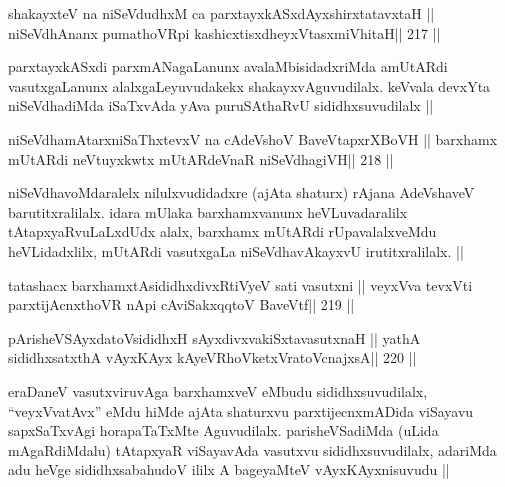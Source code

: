 
\begin{shl}
shakayxteV na niSeVdudhxM ca parxtayxkASxdAyxshirxtatavxtaH ||
niSeVdhAnanx pumathoVR\s pi kashicxtisxdheyxVtasxmiVhitaH\hfill || 217 ||
\end{shl}

\begin{center}
parxtayxkASxdi parxmANagaLanunx avalaMbisidadxriMda
amUtARdi vasutxgaLanunx alalxgaLeyuvudakekx shakayxvAguvudilalx.
keVvala devxYta niSeVdhadiMda iSaTxvAda yAva puruSAthaRvU
sididhxsuvudilalx ||
\end{center}

\begin{shl}
niSeVdhamAtarxniSaThxtevxV na cA\s\s deVshoV BaveVtapxrXBoVH ||
barxhamx mUtARdi neVtuyxkwtx mUtARdeVnaR niSeVdhagiVH\hfill || 218 ||
\end{shl}

\begin{artha}
niSeVdhavoMdaralelx nilulxvudidadxre (ajAta shaturx) rAjana
AdeVshaveV barutitxralilalx. idara mUlaka barxhamxvanunx
heVLuvadaralilx tAtapxyaRvuLaLxdUdx alalx, barxhamx mUtARdi
rUpavalalxveMdu heVLidadxlilx, mUtARdi vasutxgaLa niSeVdhavAkayxvU
irutitxralilalx. ||
\end{artha}


\begin{shl}
tatashacx barxhamxtAsididhxdivxRtiVyeV sati vasutxni ||
veyxVva tevxVti parxtijAcnxthoVR nApi cA\s\s viSakxqqtoV BaveVtf\hfill || 219 ||
\end{shl}

\begin{shl}
pArisheVSAyxdatoV\s sididhxH sAyxdivxvakiSxtavasutxnaH ||
yathA sididhxsatxthA vAyxKAyx kAyeVRhoVketxVratoV\s cnajxsA\hfill || 220 ||
\end{shl}


\begin{artha}
eraDaneV vasutxviruvAga barxhamxveV eMbudu sididhxsuvudilalx,
``veyxVvatAvx'' eMdu hiMde ajAta shaturxvu parxtijecnxmADida viSayavu
sapxSaTxvAgi horapaTaTxMte Aguvudilalx. parisheVSadiMda (uLida
mAgaRdiMdalu) tAtapxyaR viSayavAda vasutxvu sididhxsuvudilalx,
adariMda adu heVge sididhxsabahudoV ililx A bageyaMteV
vAyxKAyxnisuvudu ||
\end{artha}

